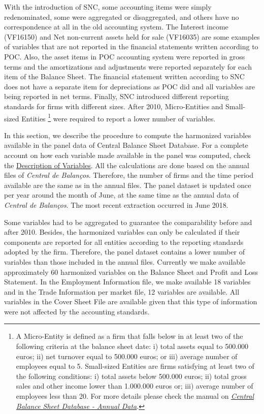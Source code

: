 \documentclass[]{book}
\let\rmarkdownfootnote\footnote%
\def\footnote{\protect\rmarkdownfootnote}
\begin{document}
With the introduction of SNC, some accounting items were simply redenominated, some were aggregated or disaggregated, and others have no correspondence at all in the old accounting system. The Interest income (VF16150) and Net non-current assets held for sale (VF16035) are some examples of variables that are not reported in the financial statements written according to POC. Also, the asset items in POC accounting system were reported in gross terms and the amortizations and adjustments were reported separately for each item of the Balance Sheet. The financial statement written according to SNC does not have a separate item for depreciations as POC did and all variables are being reported in net terms.
Finally, SNC introduced different reporting standards for firms with different sizes. After 2010, Micro-Entities and Small-sized Entities \footnote{A Micro-Entity is defined as a firm that falls below in at least two of the following criteria at the balance sheet date: i) total assets equal to 500.000 euros; ii) net turnover equal to 500.000 euros; or iii) average number of employees equal to 5. Small-sized Entities are firms satisfying at least two of the following conditions: i) total assets below 500.000 euros; ii) total gross sales and other income lower than 1.000.000 euros or; iii) average number of employees less than 20. For more details please check the manual on \href{../../CB/Jun2018/Pack_CB_Empresas_Jun18/manual_CB_Jun2018.html}{\emph{Central Balance Sheet Database - Annual Data}}.} were required to report a lower number of variables.

In this section, we describe the procedure to compute the harmonized variables available in the panel data of Central Balance Sheet Database. For a complete account on how each variable made available in the panel was computed, check the \protect\hyperlink{description-of-variables}{Description of Variables}.
All the calculations are done based on the annual files of \emph{Central de Balanços}. Therefore, the number of firms and the time period available are the same as in the annual files. The panel dataset is updated once per year around the month of June, at the same time as the annual data of \emph{Central de Balanços}. The most recent extraction occurred in June 2018.

Some variables had to be aggregated to guarantee the comparability before and after 2010. Besides, the harmonized variables can only be calculated if their components are reported for all entities according to the reporting standards adopted by the firm. Therefore, the panel dataset contains a lower number of variables than those included in the annual files.
Currently we make available approximately 60 harmonized variables on the Balance Sheet and Profit and Loss Statement. In the Employment Information file, we make available 18 variables and in the Trade Information per market file, 12 variables are available. All variables in the Cover Sheet File are available given that this type of information were not affected by the accounting standards.
\end{document}
